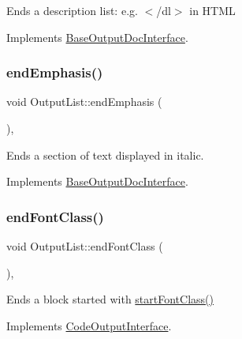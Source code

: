 Ends a description list\+: e.\+g. {\ttfamily $<$/dl$>$} in H\+T\+ML 

Implements \mbox{\hyperlink{class_base_output_doc_interface_ac25c565e9fd8aee6c2b0d9b71fcff380}{Base\+Output\+Doc\+Interface}}.

\mbox{\label{class_output_list_a5674d5d9336eb1f7f6cb83c058f5ad8f}} 
\subsubsection{\texorpdfstring{endEmphasis()}{endEmphasis()}}
{\footnotesize\ttfamily void Output\+List\+::end\+Emphasis (\begin{DoxyParamCaption}{ }\end{DoxyParamCaption})\hspace{0.3cm}{\ttfamily [inline]}, {\ttfamily [virtual]}}

Ends a section of text displayed in italic. 

Implements \mbox{\hyperlink{class_base_output_doc_interface_aed2cf04d82648509f97403bd4ce62590}{Base\+Output\+Doc\+Interface}}.

\mbox{\label{class_output_list_a484c1bcfcffe7a6cb94316ac8df64b61}} 
\subsubsection{\texorpdfstring{endFontClass()}{endFontClass()}}
{\footnotesize\ttfamily void Output\+List\+::end\+Font\+Class (\begin{DoxyParamCaption}{ }\end{DoxyParamCaption})\hspace{0.3cm}{\ttfamily [inline]}, {\ttfamily [virtual]}}

Ends a block started with \mbox{\hyperlink{class_output_list_ace178947661035b39f4dc9076595c24f}{start\+Font\+Class()}} 

Implements \mbox{\hyperlink{class_code_output_interface_a2b8ac05a391dae36793aa3aa8714a0f6}{Code\+Output\+Interface}}.

\mbox{\label{class_output_list_a14c59e71b1bb4cb6a6366a09ea62545f}} 
